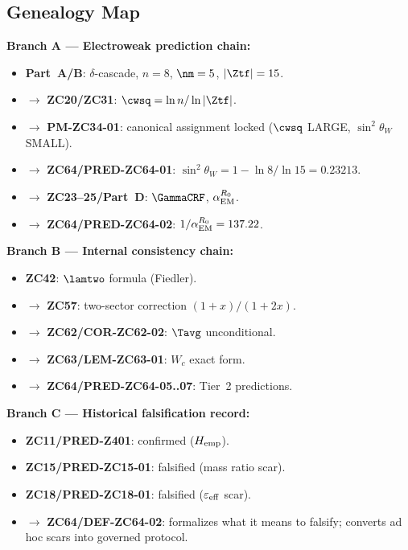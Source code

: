 \documentclass[12pt, a4paper]{article}
\renewcommand{\swsq}{\sin^2\!\theta_W}
\renewcommand{\aEM}{\alpha_{\rm EM}}
\begin{document}
\subsection{Genealogy Map}
\label{sec:genealogy}

\begin{genealogybox}[title={How ZC64's Key Objects Trace Back}]

\textbf{Branch A --- Electroweak prediction chain:}
\begin{itemize}[leftmargin=2em, noitemsep]
  \item \textbf{Part~A/B}: $\delta$-cascade, $n=8$, $\nm=5$,
    $|\Ztf|=15$.
  \item $\to$ \textbf{ZC20/ZC31}: $\cwsq = \ln n/\ln|\Ztf|$.
  \item $\to$ \textbf{PM-ZC34-01}: canonical assignment locked
    ($\cwsq$ LARGE, $\swsq$ SMALL).
  \item $\to$ \textbf{ZC64/PRED-ZC64-01}: $\swsq = 1-\ln8/\ln15 = 0.23213$.
  \item $\to$ \textbf{ZC23--25/Part~D}: $\GammaCRF$, $\aEM^{R_0}$.
  \item $\to$ \textbf{ZC64/PRED-ZC64-02}: $1/\aEM^{R_0} = 137.22$.
\end{itemize}

\textbf{Branch B --- Internal consistency chain:}
\begin{itemize}[leftmargin=2em, noitemsep]
  \item \textbf{ZC42}: $\lamtwo$ formula (Fiedler).
  \item $\to$ \textbf{ZC57}: two-sector correction $(1+x)/(1+2x)$.
  \item $\to$ \textbf{ZC62/COR-ZC62-02}: $\Tavg$ unconditional.
  \item $\to$ \textbf{ZC63/LEM-ZC63-01}: $W_c$ exact form.
  \item $\to$ \textbf{ZC64/PRED-ZC64-05..07}: Tier~2 predictions.
\end{itemize}

\textbf{Branch C --- Historical falsification record:}
\begin{itemize}[leftmargin=2em, noitemsep]
  \item \textbf{ZC11/PRED-Z401}: confirmed ($H_{\rm emp}$).
  \item \textbf{ZC15/PRED-ZC15-01}: falsified (mass ratio scar).
  \item \textbf{ZC18/PRED-ZC18-01}: falsified ($\varepsilon_{\rm eff}$ scar).
  \item $\to$ \textbf{ZC64/DEF-ZC64-02}: formalizes what it means
    to falsify; converts ad hoc scars into governed protocol.
\end{itemize}


\end{genealogybox}
\end{document}
